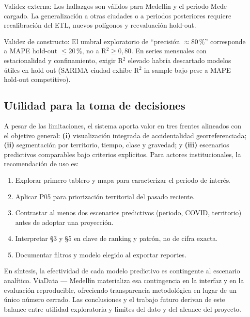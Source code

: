 Validez externa: Los hallazgos son válidos para Medellín y el periodo Mede cargado. La generalización a otras ciudades o a periodos posteriores requiere recalibración del ETL, nuevos polígonos y reevaluación hold-out.

Validez de constructo: El umbral exploratorio de ``precisión $\approx 80\,\%$'' corresponde a MAPE hold-out $\leq 20\,\%$, no a R$^2 \geq 0{,}80$. En series mensuales con estacionalidad y confinamiento, exigir R$^2$ elevado habría descartado modelos útiles en hold-out (SARIMA ciudad exhibe R$^2$ in-sample bajo pese a MAPE hold-out competitivo).

\subsection{Utilidad para la toma de decisiones}

A pesar de las limitaciones, el sistema aporta valor en tres frentes alineados con el objetivo general: \textbf{(i)} visualización integrada de accidentalidad georreferenciada; \textbf{(ii)} segmentación por territorio, tiempo, clase y gravedad; y \textbf{(iii)} escenarios predictivos comparables bajo criterios explícitos. Para actores institucionales, la recomendación de uso es:

\begin{enumerate}
	\item Explorar primero tablero y mapa para caracterizar el periodo de interés.
	\item Aplicar P05 para priorización territorial del pasado reciente.
	\item Contrastar al menos dos escenarios predictivos (periodo, COVID, territorio) antes de adoptar una proyección.
	\item Interpretar §3 y §5 en clave de ranking y patrón, no de cifra exacta.
	\item Documentar filtros y modelo elegido al exportar reportes.
\end{enumerate}

En síntesis, la efectividad de cada modelo predictivo es contingente al escenario analítico. ViaData — Medellín materializa esa contingencia en la interfaz y en la evaluación reproducible, ofreciendo transparencia metodológica en lugar de un único número cerrado. Las conclusiones y el trabajo futuro derivan de este balance entre utilidad exploratoria y límites del dato y del alcance del proyecto.
